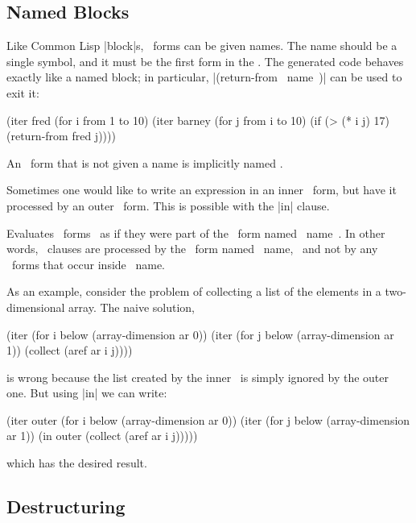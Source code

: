 \subsection{Named Blocks}

Like Common Lisp |block|s, \iter\ forms can be given names.  The
name should be a single symbol, and it must be the first form in the
\iter.  The generated code behaves exactly like a named block; in
particular, |(return-from ~name~)| can be used to exit it:
\begin{program}
(iter fred
      (for i from 1 to 10)
      (iter barney
            (for j from i to 10)
            (if (> (* i j) 17)
                (return-from fred j))))
\end{program}
An \iter\ form that is not given a name is implicitly named \nil.

Sometimes one would like to write an expression in an inner \iter\ form,
but have it processed by an outer \iter\ form.  This is possible with
the |in| clause.

\begin{clauses}

Evaluates ~forms~ as if they were part of the \iter\ form named
~name~.  In other words, \iter\ clauses are processed by the \iter\
form named ~name,~ and not by any \iter\ forms that occur inside ~name.~

\cpar As an example, consider the problem of collecting a list of the
elements in a two-dimensional array.  The naive solution,
\begin{program}
(iter (for i below (array-dimension ar 0))
      (iter (for j below (array-dimension ar 1))
            (collect (aref ar i j))))
\end{program}
\noindent is wrong because the list created by the inner \iter\ is simply
ignored by the outer one.  But using |in| we can write:
\begin{program}
(iter outer (for i below (array-dimension ar 0))
      (iter (for j below (array-dimension ar 1))
            (in outer (collect (aref ar i j)))))
\end{program}
\noindent which has the desired result.

\end{clauses}

\subsection{Destructuring}
\label{destructuring}

